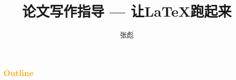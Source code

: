 \documentclass[13pt]{ctexbeamer}
\begin{document}
\title[让LaTeX跑起来]{论文写作指导  ---  让LaTeX跑起来}
\author[]{{\large 张彪} }

\date{}


%



\begin{frame}
\maketitle
\end{frame}


\begin{frame}
	\frametitle{\textcolor{orange}{Outline}}
	\tableofcontents
\end{frame}
\end{document}
